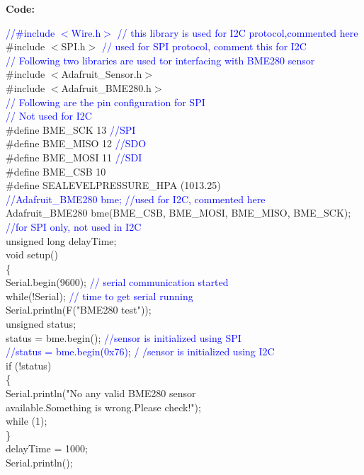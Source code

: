 \documentclass[12pt,a4paper]{article}
\begin{document}
\hspace{1.7cm}\textbf{\large Code:}\\[6pt]
\setlength{\parindent}{7eM}

\textcolor{blue}{//\#include $<$Wire.h$>$ // this library is used for I2C protocol,commented here}\\
\#include $<$SPI.h$>$ \textcolor{blue}{// used for SPI protocol, comment this for I2C}\\
\textcolor{blue}{// Following two libraries are used tor interfacing with BME280 sensor}\\
#include $<$Adafruit\_Sensor.h$>$\\
#include $<$Adafruit\_BME280.h$>$\\
\textcolor{blue}{// Following are the pin configuration for SPI\\
// Not used for I2C}\\
\#define BME\_SCK 13   \textcolor{blue}{//SPI} \\
\#define BME\_MISO 12  \textcolor{blue}{//SDO}  \\
\#define BME\_MOSI 11 \textcolor{blue}{ //SDI } \\
\#define BME\_CSB 10 \\
\#define SEALEVELPRESSURE\_HPA (1013.25)\\

\textcolor{blue}{//Adafruit\_BME280 bme; //used for I2C, commented here}\\
Adafruit\_BME280 bme(BME\_CSB, BME\_MOSI, BME\_MISO, BME\_SCK);\\ 
\textcolor{blue}{//for SPI only, not used in I2C}\\
unsigned long delayTime;\\[13pt]

void setup()\\
\{\\
Serial.begin(9600); \textcolor{blue}{// serial communication started}\\
    while(!Serial);   \textcolor{blue} { // time to get serial running}\\
    Serial.println(F("BME280 test"));\\

    unsigned status;\\
    status = bme.begin(); \textcolor{blue}{//sensor is initialized using SPI \\ 
    //status = bme.begin(0x76); / /sensor is initialized using I2C}\\

     if (!status)\\
     \{\\
Serial.println("No any valid BME280 sensor\\ available.Something is wrong.Please      check!");\\
  while (1);\\
     \}\\
    delayTime = 1000;\\
    Serial.println();\\
\end{document}

